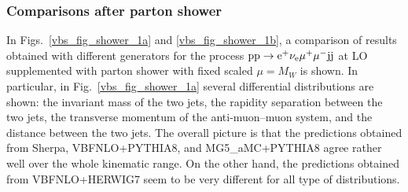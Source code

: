 \subsubsection*{Comparisons after parton shower}

In Figs.~\ref{vbs_fig_shower_1a} and \ref{vbs_fig_shower_1b}, a comparison of results obtained with different
generators for the process ${\rm p} {\rm p} \to {\rm e}^+  \nu_{\rm e}  \mu^+ \mu^- {\rm j} {\rm j}$ at LO supplemented with parton shower with fixed scaled $\mu =M_W$ is shown. 
In particular, in Fig.~\ref{vbs_fig_shower_1a} several differential distributions are shown:
the invariant mass of the two jets, the rapidity separation between the two jets, the transverse momentum of the anti-muon--muon system, and the distance between the two jets.
The overall picture is that the predictions obtained from {\sc Sherpa}, {\sc VBFNLO}+{\sc PYTHIA8}, and {\sc MG5\_aMC}+{\sc PYTHIA8} agree rather well over the whole kinematic range.
On the other hand, the predictions obtained from {\sc VBFNLO}+{\sc HERWIG7} seem to be very different for all type of distributions.


